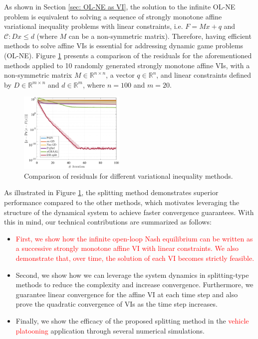 \documentclass[letterpaper, 10 pt, conference]{ieeeconf}  %
\begin{document}
As shown in Section \ref{sec: OL-NE as VI}, the solution to the infinite OL-NE problem is equivalent to solving a sequence of strongly monotone affine variational inequality problems with linear constraints, i.e. $F = Mx + q$ and $\mathcal{C}: Dx \leq d$ (where $M$ can be a non-symmetric matrix). Therefore, having efficient methods to solve affine VIs is essential for addressing dynamic game problems (OL-NE). Figure \ref{fig1} presents a comparison of the residuals for the aforementioned methods applied to 10 randomly generated strongly monotone affine VIs, with a non-symmetric matrix $M \in \mathbb{R}^{n \times n}$, a vector $q \in \mathbb{R}^n$, and linear constraints defined by $D \in \mathbb{R}^{m \times n}$ and $d \in \mathbb{R}^{m}$, where $n = 100$ and $m = 20$.
\begin{figure}[!h]
     \centering
           \includegraphics[width=0.45\textwidth]{VImethods.eps}
           \caption{Comparison of residuals for different variational inequality methods.}
           \label{fig1}
\end{figure}
As illustrated in Figure \ref{fig1}, the splitting method demonstrates superior performance compared to the other methods, which motivates leveraging the structure of the dynamical system to achieve faster convergence guarantees. With this in mind, our technical contributions are summarized as follows:
\begin{itemize}
   \item \textcolor{red}{First, we show how the infinite open-loop Nash equilibrium can be written as a successive strongly monotone affine VI with linear constraints. We also demonstrate that, over time, the solution of each VI becomes strictly feasible.}
   \item Second, we show how we can leverage the system dynamics in splitting-type methods to reduce the complexity and increase convergence. Furthermore, we guarantee linear convergence for the affine VI at each time step and also prove the quadratic convergence of VIs as the time step increases.
   \item Finally, we show the efficacy of the proposed splitting method in the \textcolor{red}{vehicle platooning} application through several numerical simulations.
\end{itemize}
\end{document}
